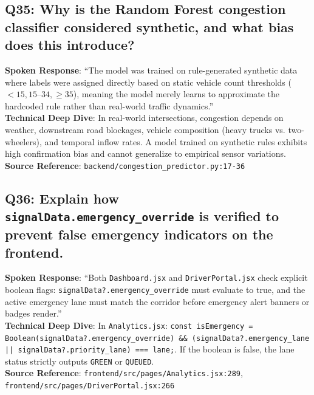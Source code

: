 \subsection*{Q35: Why is the Random Forest congestion classifier considered synthetic, and what bias does this introduce?}
\begin{interviewbox}
\textbf{Spoken Response}: ``The model was trained on rule-generated synthetic data where labels were assigned directly based on static vehicle count thresholds ($<15, 15\text{--}34, \ge 35$), meaning the model merely learns to approximate the hardcoded rule rather than real-world traffic dynamics.''\\
\textbf{Technical Deep Dive}: In real-world intersections, congestion depends on weather, downstream road blockages, vehicle composition (heavy trucks vs. two-wheelers), and temporal inflow rates. A model trained on synthetic rules exhibits high confirmation bias and cannot generalize to empirical sensor variations.\\
\textbf{Source Reference}: \texttt{backend/congestion\_predictor.py:17-36}
\end{interviewbox}

\subsection*{Q36: Explain how \texttt{signalData.emergency\_override} is verified to prevent false emergency indicators on the frontend.}
\begin{interviewbox}
\textbf{Spoken Response}: ``Both \texttt{Dashboard.jsx} and \texttt{DriverPortal.jsx} check explicit boolean flags: \texttt{signalData?.emergency\_override} must evaluate to true, and the active emergency lane must match the corridor before emergency alert banners or badges render.''\\
\textbf{Technical Deep Dive}: In \texttt{Analytics.jsx}: \texttt{const isEmergency = Boolean(signalData?.emergency\_override) \&\& (signalData?.emergency\_lane || signalData?.priority\_lane) === lane;}. If the boolean is false, the lane status strictly outputs \texttt{GREEN} or \texttt{QUEUED}.\\
\textbf{Source Reference}: \texttt{frontend/src/pages/Analytics.jsx:289}, \texttt{frontend/src/pages/DriverPortal.jsx:266}
\end{interviewbox}

